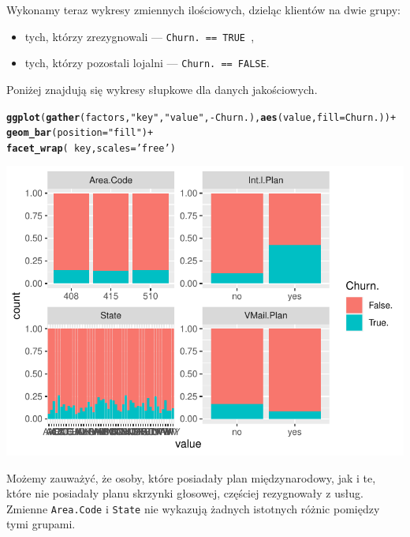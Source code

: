 \documentclass{article}\usepackage[]{graphicx}\usepackage[]{color}
\makeatletter
\def\maxwidth{ %
  \ifdim\Gin@nat@width>\linewidth
    \linewidth
  \else
    \Gin@nat@width
  \fi
}
\newcommand{\hlstr}[1]{\textcolor[rgb]{0.192,0.494,0.8}{#1}}%
\newcommand{\hlopt}[1]{\textcolor[rgb]{0,0,0}{#1}}%
\newcommand{\hlstd}[1]{\textcolor[rgb]{0.345,0.345,0.345}{#1}}%
\newcommand{\hlkwc}[1]{\textcolor[rgb]{0.333,0.667,0.333}{#1}}%
\newcommand{\hlkwd}[1]{\textcolor[rgb]{0.737,0.353,0.396}{\textbf{#1}}}%
\newenvironment{kframe}{%
 \def\at@end@of@kframe{}%
 \ifinner\ifhmode%
  \def\at@end@of@kframe{\end{minipage}}%
  \begin{minipage}{\columnwidth}%
 \fi\fi%
 \def\FrameCommand##1{\hskip\@totalleftmargin \hskip-\fboxsep
 \colorbox{shadecolor}{##1}\hskip-\fboxsep
     \hskip-\linewidth \hskip-\@totalleftmargin \hskip\columnwidth}%
 \MakeFramed {\advance\hsize-\width
   \@totalleftmargin\z@ \linewidth\hsize
   \@setminipage}}%
 {\par\unskip\endMakeFramed%
 \at@end@of@kframe}
\newenvironment{knitrout}{}{} %
\makeatother
\begin{document}
Wykonamy teraz wykresy zmiennych ilościowych, dzieląc klientów na dwie grupy:
\begin{itemize}
  \item tych, którzy zrezygnowali --- \verb|Churn. == TRUE |,
  \item tych, którzy pozostali lojalni --- \verb|Churn. == FALSE|.
\end{itemize}


Poniżej znajdują się wykresy słupkowe dla danych jakościowych.
\begin{knitrout}
\color{fgcolor}\begin{kframe}
\begin{alltt}
\hlkwd{ggplot}\hlstd{(}\hlkwd{gather}\hlstd{(factors,} \hlstr{"key"}\hlstd{,} \hlstr{"value"}\hlstd{,} \hlopt{-}\hlstd{Churn.),} \hlkwd{aes}\hlstd{(value,} \hlkwc{fill}\hlstd{=Churn.))} \hlopt{+}
  \hlkwd{geom_bar}\hlstd{(}\hlkwc{position}\hlstd{=}\hlstr{"fill"}\hlstd{)} \hlopt{+}
  \hlkwd{facet_wrap}\hlstd{(}\hlopt{~}\hlstd{key,} \hlkwc{scales}\hlstd{=}\hlstr{'free'}\hlstd{)}
\end{alltt}
\end{kframe}

{\centering \includegraphics[width=\maxwidth]{figure/Wykresy_slupkowe_dla_wszystkich_zmiennych-1} 

}



\end{knitrout}

Możemy zauważyć, że osoby, które posiadały plan międzynarodowy, jak i te, które nie posiadały planu skrzynki głosowej, częściej rezygnowały z usług. Zmienne \verb|Area.Code| i \verb|State| nie wykazują żadnych istotnych różnic pomiędzy tymi grupami.
\end{document}
